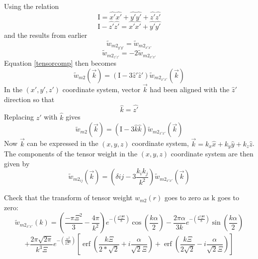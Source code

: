 \documentclass[double,12pt]{beavtex}
\begin{document}
\noindent Using the relation
\begin{displaymath}{\text{I} = \hat{x'}\hat{x'} + \hat{y'}\hat{y'} + \hat{z'}\hat{z'}}\end{displaymath}
\begin{displaymath}{\text{I} -\hat{z'}\hat{z'} = \hat{x'}\hat{x'} + \hat{y'}\hat{y'}}\end{displaymath}
and the results from earlier
\begin{equation}{\widetilde{w}_{{m2}_{y'y'}}=\widetilde{w}_{{m2}_{x'x'}}}\end{equation}
\begin{equation}{\widetilde{w}_{{m2}_{z'z'}}=-2\widetilde{w}_{{m2}_{x'x'}}}\end{equation}
Equation \ref{tensorcomp} then becomes 
\begin{equation}{\widetilde{w}_{m2}(\vec{k})= (\text{I}-3\hat{z}'\hat{z}')\widetilde{w}_{{m2}_{x'x'}}(\vec{k})}\end{equation}
\noindent In the $(x',y',z')$ coordinate system, vector $\vec{k}$ had 
been aligned with the $\hat{z}'$ direction so that 
\begin{displaymath}{\hat{k}=\hat{z'}}\end{displaymath}
Replacing $\hat{z}'$ with $\hat{k}$ gives
\begin{equation}{\widetilde{w}_{m2}(\vec{k})= (\text{I}-3\hat{k}\hat{k})\widetilde{w}_{{m2}_{x'x'}}(\vec{k})}\end{equation}
Now  $\vec{k}$ can be expressed in the $(x,y,z)$ coordinate system, 
$\vec{k}=k_x\hat{x} + k_y\hat{y} + k_z\hat{z}$. The components of the 
tensor weight in the $(x,y,z)$ coordinate system are then given by
\begin{equation}{\widetilde{w}_{m2_{ij}}(\vec{k})= (\delta{ij}-3\frac{k_ik_j}{k^2})\widetilde{w}_{{m2}_{x'x'}}(\vec{k})}\end{equation}

\noindent Check that the transform of tensor weight ${w}_{m2}(r)$ 
goes to zero as k goes to zero:
\begin{displaymath}{\widetilde{w}_{{m2}_{x'x'}}(k)=\left(\frac{-\pi\Xi^2}{3}-\frac{4\pi}{k^2}\right)e^{-\left(\frac{k^2\Xi^2}{8}\right)}\cos(\frac{k\alpha}{2})-\frac{2\pi\alpha}{3k}e^{-\left(\frac{k^2\Xi^2}{8}\right)}\sin(\frac{k\alpha}{2})}\end{displaymath} 
\begin{equation}{+\frac{2\pi\sqrt{2\pi}}{k^3\Xi}e^{-\left(\frac{\alpha^2}{2\Xi^2}\right)}\left[\operatorname{erf}\left(\frac{k\Xi}{2*\sqrt{2}}+i\frac{\alpha}{\sqrt{2}\Xi}\right)+\operatorname{erf}\left(\frac{k\Xi}{2\sqrt{2}}-i\frac{\alpha}{\sqrt{2}\Xi}\right)\right]}\end{equation}
\end{document}
